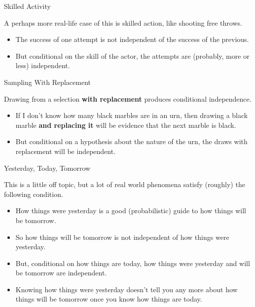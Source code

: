 \documentclass[
  ignorenonframetext,
]{beamer}
\providecommand{\tightlist}{%
  \setlength{\itemsep}{0pt}\setlength{\parskip}{0pt}}
\renewcommand{\,}{\text{, }}
\begin{document}
\begin{frame}{Skilled Activity}
\protect\hypertarget{skilled-activity}{}

A perhaps more real-life case of this is skilled action, like shooting
free throws.

\begin{itemize}
\tightlist
\item
  The success of one attempt is not independent of the success of the
  previous.
\item
  But conditional on the skill of the actor, the attempts are (probably,
  more or less) independent.
\end{itemize}

\end{frame}

\begin{frame}{Sampling With Replacement}
\protect\hypertarget{sampling-with-replacement}{}

Drawing from a selection \textbf{with replacement} produces conditional
independence.

\begin{itemize}
\tightlist
\item
  If I don't know how many black marbles are in an urn, then drawing a
  black marble \textbf{and replacing it} will be evidence that the next
  marble is black.
\item
  But conditional on a hypothesis about the nature of the urn, the draws
  with replacement will be independent.
\end{itemize}

\end{frame}

\begin{frame}{Yesterday, Today, Tomorrow}
\protect\hypertarget{yesterday-today-tomorrow}{}

This is a little off topic, but a lot of real world phenomena satisfy
(roughly) the following condition.

\begin{itemize}
\tightlist
\item
  How things were yesterday is a good (probabilistic) guide to how
  things will be tomorrow.
\item
  So how things will be tomorrow is not independent of how things were
  yesterday. \pause
\item
  But, conditional on how things are today, how things were yesterday
  and will be tomorrow are independent.
\item
  Knowing how things were yesterday doesn't tell you any more about how
  things will be tomorrow once you know how things are today.
\end{itemize}

\end{frame}
\end{document}
